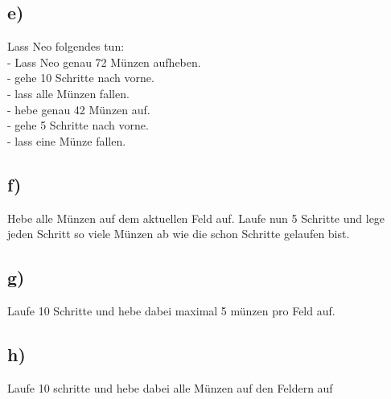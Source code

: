 \subsection*{e)}
Lass Neo folgendes tun:\\
- Lass Neo genau 72 Münzen aufheben. \\
- gehe 10 Schritte nach vorne.\\
- lass alle Münzen fallen.\\
- hebe genau 42 Münzen auf.\\
- gehe 5 Schritte nach vorne.\\
- lass eine Münze fallen.

\subsection*{f)}
Hebe alle Münzen auf dem aktuellen Feld auf. Laufe nun 5 Schritte und lege jeden Schritt so viele Münzen ab wie die schon Schritte gelaufen bist.

\subsection*{g)}
 Laufe 10 Schritte und hebe dabei maximal 5 münzen pro Feld auf.

\subsection*{h)}
Laufe 10 schritte und hebe dabei alle Münzen auf den Feldern auf
\newpage
